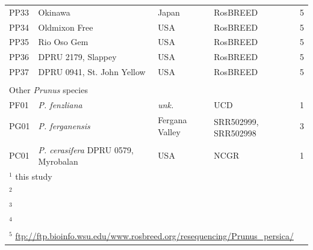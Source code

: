 \documentclass[12pt]{article}
\begin{document}
\begin{center}
\begin{longtable}{llllc}
	PP33 &Okinawa &Japan &RosBREED &5\\
	PP34 &Oldmixon Free &USA &RosBREED &5\\
	PP35 &Rio Oso Gem &USA &RosBREED &5\\
	PP36 &DPRU 2179, Slappey &USA &RosBREED &5\\
	PP37 &DPRU 0941, St. John Yellow &USA &RosBREED &5\\
	\\
	\multicolumn{5}{l}{Other \emph{Prunus} species}  \\
	PF01 &\emph{P. fenzliana} &\emph{unk.} &UCD &1\\
	PG01 &\emph{P. ferganensis} &Fergana Valley &
	\multirow{2}{1cm}{SRR502999, SRR502998} &3\\
	\\
	PC01 &\emph{P. cerasifera} DPRU 0579, Myrobalan &USA &NCGR &1\\ \hline \hline
	\multicolumn{5}{l}{$^{1}$ this study}\\
	\multicolumn{5}{l}{$^{2}$ \citealp{koepke2013comparative}}\\
	\multicolumn{5}{l}{$^{3}$ \citealp{verde2013high}}\\
	\multicolumn{5}{l}{$^{4}$ \citealp{ahmad2011whole}}\\
	\multicolumn{5}{l}{$^{5}$ \url{ftp://ftp.bioinfo.wsu.edu/www.rosbreed.org/resequencing/Prunus_persica/}}\\
\end{longtable}
\end{center}
\end{document}
